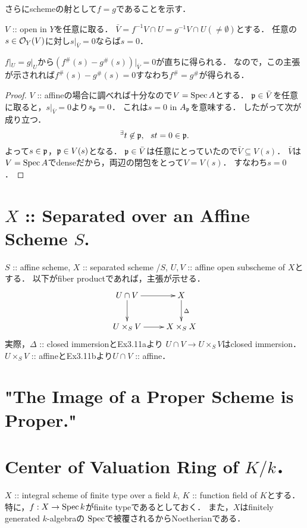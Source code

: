 \documentclass[a4paper]{jsarticle}
\begin{document}
    さらにschemeの射として$f=g$であることを示す．
    \begin{Claim}
        $V$ :: open in $Y$を任意に取る．
        $\bar{V}=f^{-1}V \cap U=g^{-1}V \cap U(\neq \emptyset)$とする．
        任意の$s \in \mathcal{O}_Y(V)$に対し$s|_{\bar{V}}=0$ならば$s=0$．
    \end{Claim}
    $f|_U=g|_U$から$(f^{\#}(s)-g^{\#}(s))|_{\bar{V}}=0$が直ちに得られる．
    なので，この主張が示されれば$f^{\#}(s)-g^{\#}(s)=0$すなわち$f^{\#}=g^{\#}$が得られる．
    \begin{proof}
        $V$ :: affineの場合に調べれば十分なので$V=\operatorname{Spec} A$とする．
        $\mathfrak{p} \in \bar{V}$を任意に取ると，$s|_{\bar{V}}=0$より$s_{\mathfrak{p}}=0$．
        これは$s=0$ in $A_{\mathfrak{p}}$を意味する．
        したがって次が成り立つ．
        \[ {}^{\exists} t \not \in \mathfrak{p},~~ st=0 \in \mathfrak{p}. \]
        よって$s \in \mathfrak{p}$，$\mathfrak{p} \in V(s)$となる．
        $\mathfrak{p} \in \bar{V}$は任意にとっていたので$\bar{V} \subseteq V(s)$．
        $\bar{V}$は$V=\operatorname{Spec} A$でdenseだから，両辺の閉包をとって$V=V(s)$．
        すなわち$s=0$．
    \end{proof}

\section{$X$ :: Separated over an Affine Scheme $S$.} %
    $S$ :: affine scheme, $X$ :: separated scheme /$S$,
    $U, V$ :: affine open subscheme of $X$とする．
    以下がfiber productであれば，主張が示せる．
    \[
    \xymatrix
    {
        U \cap V \ar[d]\ar[r]& X \ar[d]^-{\Delta} \\
    U \times_S V \ar[r]& X \times_S X
    }
    \]
    実際，$\Delta$ :: closed immersionとEx3.11aより
    $U \cap V \to U \times_S V$はclosed immersion．
    $U \times_S V$ :: affineとEx3.11bより$U \cap V$ :: affine．

\section{"The Image of a Proper Scheme is Proper."} %

\section{Center of Valuation Ring of $K/k$．} %
    $X$ :: integral scheme of finite type over a field $k$,
    $K$ :: function field of $K$とする．
    特に，$f: X \to \operatorname{Spec} k$がfinite typeであるとしておく．
    また，$X$はfinitely generated $k$-algebraの
    $\operatorname{Spec}$で被覆されるからNoetherianである．
\end{document}
